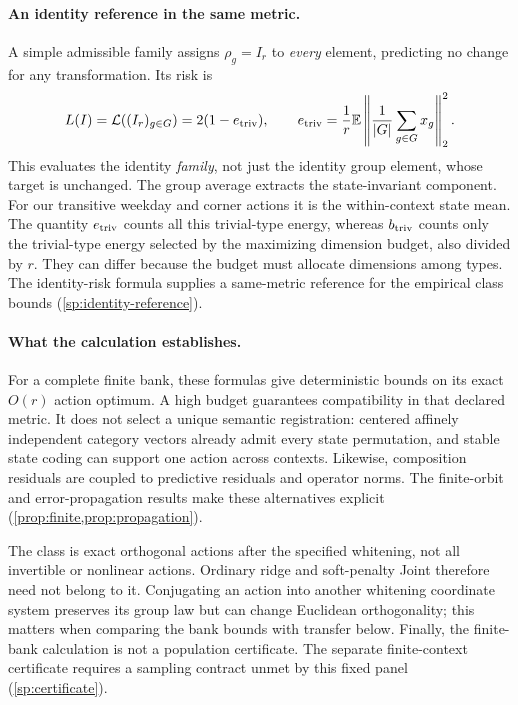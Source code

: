 \paragraph{An identity reference in the same metric.}
A simple admissible family assigns $\rho_g=I_r$ to \emph{every} element, predicting no change for any transformation. Its risk is
\begin{equation}
 L(I)=\mathcal L((I_r)_{g\in G})=2(1-e_{\rm triv}),
 \qquad
 e_{\rm triv}=\frac1r\mathbb E\left\|\frac1{|G|}\sum_{g\in G}x_g\right\|_2^2.
 \label{eq:identity-reference-main}
\end{equation}
This evaluates the identity \emph{family}, not just the identity group element, whose target is unchanged. The group average extracts the state-invariant component. For our transitive weekday and corner actions it is the within-context state mean. The quantity $e_{\rm triv}$ counts all this trivial-type energy, whereas $b_{\rm triv}$ counts only the trivial-type energy selected by the maximizing dimension budget, also divided by $r$. They can differ because the budget must allocate dimensions among types. The identity-risk formula supplies a same-metric reference for the empirical class bounds (\cref{sp:identity-reference}).

\paragraph{What the calculation establishes.}
For a complete finite bank, these formulas give deterministic bounds on its exact $O(r)$ action optimum. A high budget guarantees compatibility in that declared metric. It does not select a unique semantic registration: centered affinely independent category vectors already admit every state permutation, and stable state coding can support one action across contexts. Likewise, composition residuals are coupled to predictive residuals and operator norms. The finite-orbit and error-propagation results make these alternatives explicit (\cref{prop:finite,prop:propagation}).

The class is exact orthogonal actions after the specified whitening, not all invertible or nonlinear actions. Ordinary ridge and soft-penalty Joint therefore need not belong to it. Conjugating an action into another whitening coordinate system preserves its group law but can change Euclidean orthogonality; this matters when comparing the bank bounds with transfer below. Finally, the finite-bank calculation is not a population certificate. The separate finite-context certificate requires a sampling contract unmet by this fixed panel (\cref{sp:certificate}).
